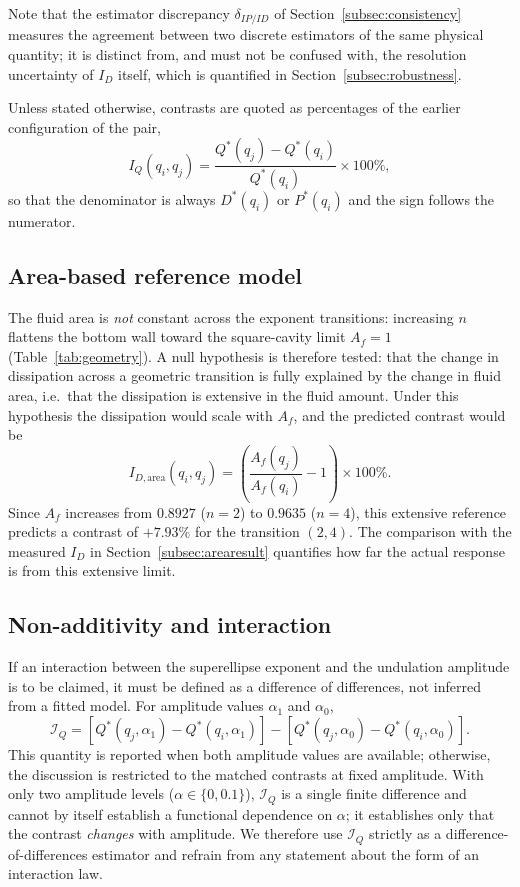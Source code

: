Note that the estimator discrepancy $\delta_{IP/ID}$ of Section~\ref{subsec:consistency} measures the agreement between two discrete estimators of the same physical quantity; it is distinct from, and must not be confused with, the resolution uncertainty of $I_D$ itself, which is quantified in Section~\ref{subsec:robustness}.

Unless stated otherwise, contrasts are quoted as percentages of the earlier configuration of the pair,
\begin{equation}
I_Q(q_i,q_j)=\frac{Q^*(q_j)-Q^*(q_i)}{Q^*(q_i)}\times 100\%,
\end{equation}
so that the denominator is always $D^*(q_i)$ or $P^*(q_i)$ and the sign follows the numerator.

\subsection{Area-based reference model}
\label{subsec:area}

The fluid area is \emph{not} constant across the exponent transitions: increasing $n$ flattens the bottom wall toward the square-cavity limit $A_f=1$ (Table~\ref{tab:geometry}). A null hypothesis is therefore tested: that the change in dissipation across a geometric transition is fully explained by the change in fluid area, i.e.\ that the dissipation is extensive in the fluid amount. Under this hypothesis the dissipation would scale with $A_f$, and the predicted contrast would be
\begin{equation}
I_{D,\mathrm{area}}(q_i,q_j) = \left(\frac{A_f(q_j)}{A_f(q_i)} - 1\right)\times 100\%.
\label{eq:area}
\end{equation}
Since $A_f$ increases from $0.8927$ ($n=2$) to $0.9635$ ($n=4$), this extensive reference predicts a contrast of $+7.93\%$ for the transition $(2,4)$. The comparison with the measured $I_D$ in Section~\ref{subsec:arearesult} quantifies how far the actual response is from this extensive limit.
\subsection{Non-additivity and interaction}
\label{subsec:interaction}

If an interaction between the superellipse exponent and the undulation amplitude is to be claimed, it must be defined as a difference of differences, not inferred from a fitted model. For amplitude values $\alpha_1$ and $\alpha_0$,
\begin{equation}
\mathcal{I}_Q = \left[Q^*(q_j,\alpha_1)-Q^*(q_i,\alpha_1)\right] - \left[Q^*(q_j,\alpha_0)-Q^*(q_i,\alpha_0)\right].
\end{equation}
This quantity is reported when both amplitude values are available; otherwise, the discussion is restricted to the matched contrasts at fixed amplitude. With only two amplitude levels ($\alpha\in\{0,0.1\}$), $\mathcal{I}_Q$ is a single finite difference and cannot by itself establish a functional dependence on $\alpha$; it establishes only that the contrast \emph{changes} with amplitude. We therefore use $\mathcal{I}_Q$ strictly as a difference-of-differences estimator and refrain from any statement about the form of an interaction law.




